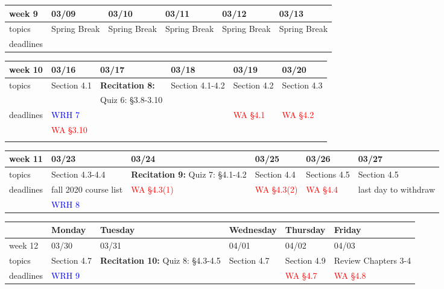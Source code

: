 \documentclass[11pt]{article}
\begin{document}
\begin{center}
\begin{tabularx}{\textwidth}{|p{1.5cm}|| L | L | L | L | L |}
\hline
week 9&03/09&03/10&03/11&03/12&03/13\\ \hline
topics &Spring Break&Spring Break&Spring Break&Spring Break&Spring Break\\
\hline 
deadlines&&&&&\\ \hline \end{tabularx} \end{center}

\begin{center}
\begin{tabularx}{\textwidth}{|p{1.5cm}|| L | L | L | L | L |}
\hline
week 10&03/16&03/17&03/18&03/19&03/20\\ \hline
topics&Section 4.1&\textbf{Recitation 8:}&Section 4.1-4.2&Section 4.2&Section 4.3\\ 
&&{Quiz 6}: \S 3.8-3.10&&&\\ \hline
deadlines& \textcolor{blue}{WRH 7}& &&\textcolor{red}{WA \S 4.1}&\textcolor{red}{WA \S 4.2} \\ 
&\textcolor{red}{WA \S 3.10}&&&&\\
&&&&&\\ \hline \end{tabularx} \end{center}

\begin{center}
\begin{tabularx}{\textwidth}{|p{1.5cm}|| L | L | L | L | L |}
\hline
week 11&03/23&03/24&03/25&03/26&03/27\\ \hline
topics&Section 4.3-4.4&\textbf{Recitation 9:} {Quiz 7}: \S4.1-4.2&Section 4.4&Sections 4.5&Section 4.5\\ 
\hline
deadlines&\textcolor{ddgreen}{fall 2020 course list}&\textcolor{red}{WA \S 4.3(1)}&\textcolor{red}{WA \S 4.3(2)}&\textcolor{red}{WA \S 4.4}&\textcolor{ddgreen}{last day to withdraw} \\
&\textcolor{blue}{WRH 8}&&&&\\
 \hline  \end{tabularx} \end{center}
 
 \newpage
 
 \begin{center}
\begin{tabularx}{\textwidth}{|p{1.5cm}|| L | L | L | L | L |}
\hline
&Monday & Tuesday & Wednesday & Thursday & Friday \\
\hline 
week 12&03/30&03/31&04/01&04/02&04/03\\ \hline
topics&Section 4.7&\textbf{Recitation 10:}  {Quiz 8}: \S4.3-4.5&Section 4.7&Section 4.9&Review Chapters 3-4\\ 
\hline
deadlines&\textcolor{blue}{WRH 9}& &&\textcolor{red}{WA \S 4.7}&\textcolor{red}{WA \S 4.8} \\\hline
\end{tabularx} \end{center}
\end{document}
